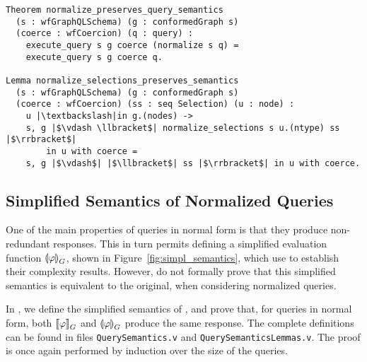 \begin{verbatim}
Theorem normalize_preserves_query_semantics 
  (s : wfGraphQLSchema) (g : conformedGraph s)
  (coerce : wfCoercion) (q : query) :
    execute_query s g coerce (normalize s q) =
    execute_query s g coerce q.
    
Lemma normalize_selections_preserves_semantics
  (s : wfGraphQLSchema) (g : conformedGraph s) 
  (coerce : wfCoercion) (ss : seq Selection) (u : node) :
    u |\textbackslash|in g.(nodes) ->
    s, g |$\vdash \llbracket$| normalize_selections s u.(ntype) ss |$\rrbracket$|
        in u with coerce =
    s, g |$\vdash$| |$\llbracket$| ss |$\rrbracket$| in u with coerce. 
\end{verbatim}



\subsection{Simplified Semantics of Normalized Queries}
\label{sec:simpl-semantics}

One of the main properties of queries in normal form is that they produce non-redundant responses.
This in turn permits defining a simplified evaluation function $\llparenthesis \varphi \rrparenthesis^{}_{G}$, shown in Figure~\ref{fig:simpl_semantics}, which \HP use to establish their complexity results.
However, \HP do not formally prove that this simplified semantics is equivalent to the original, when considering normalized queries.

In \gcoql, we define the simplified semantics of \HP, and prove that, for queries in normal form, both $\llbracket \varphi \rrbracket^{}_{G}$ and $\llparenthesis \varphi \rrparenthesis^{}_{G}$ produce the same response.  The complete definitions can be found in files \texttt{QuerySemantics.v} and \texttt{QuerySemanticsLemmas.v}. 
%
The proof is once again performed by induction over the size of the queries.

